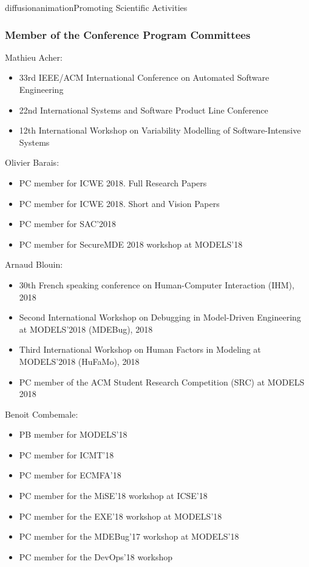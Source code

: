 \documentclass{ra2018}
\begin{document}
\begin{module}{diffusion}{animation}{Promoting Scientific Activities}
    \subsubsection{Member of the Conference Program Committees}

Mathieu Acher:
\begin{itemize}
	\item 33rd IEEE/ACM International Conference on Automated Software Engineering 
	\item 22nd International Systems and Software Product Line Conference 
	\item 12th International Workshop on Variability Modelling of Software-Intensive Systems
\end{itemize}     


Olivier Barais: 
\begin{itemize}
	\item PC member for ICWE 2018. Full Research Papers	
	\item PC member for ICWE 2018. Short and Vision Papers
	\item PC member for SAC'2018
	\item PC member for SecureMDE 2018 workshop  at MODELS’18
\end{itemize} 


Arnaud Blouin:
\begin{itemize}
	\item 30th French speaking conference on Human-Computer Interaction (IHM), 2018
	\item Second International Workshop on Debugging in Model-Driven Engineering at MODELS'2018 (MDEBug), 2018
	\item Third International Workshop on Human Factors in Modeling at MODELS'2018 (HuFaMo), 2018
	\item PC member of the ACM Student Research Competition (SRC) at MODELS 2018
\end{itemize} 

    
    Benoit Combemale: 
\begin{itemize}
	\item PB member for MODELS’18
	\item PC member for ICMT’18
	\item PC member for ECMFA’18
	\item PC member for the MiSE’18 workshop at ICSE’18
	\item PC member for the EXE’18 workshop at MODELS’18
         \item PC member for the MDEBug’17 workshop at MODELS’18
	\item PC member for the DevOps’18 workshop
\end{itemize} 


\end{module}
\end{document}
